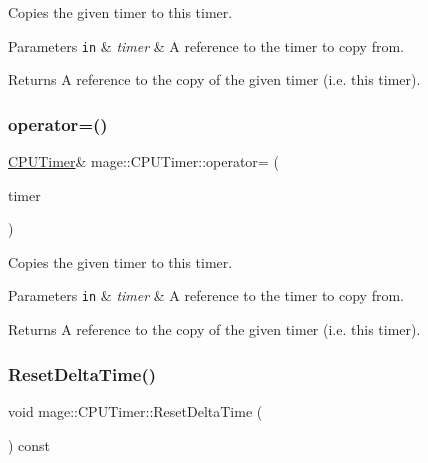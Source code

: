 Copies the given timer to this timer.


\begin{DoxyParams}[1]{Parameters}
\mbox{\tt in}  & {\em timer} & A reference to the timer to copy from. \\
\hline
\end{DoxyParams}
\begin{DoxyReturn}{Returns}
A reference to the copy of the given timer (i.\+e. this timer). 
\end{DoxyReturn}
\hypertarget{classmage_1_1_c_p_u_timer_aee546b06c3b665bc1868abc3d7e3a06d}{}\label{classmage_1_1_c_p_u_timer_aee546b06c3b665bc1868abc3d7e3a06d} 
\subsubsection{\texorpdfstring{operator=()}{operator=()}\hspace{0.1cm}{\footnotesize\ttfamily [2/2]}}
{\footnotesize\ttfamily \hyperlink{classmage_1_1_c_p_u_timer}{C\+P\+U\+Timer}\& mage\+::\+C\+P\+U\+Timer\+::operator= (\begin{DoxyParamCaption}\item[{\hyperlink{classmage_1_1_c_p_u_timer}{C\+P\+U\+Timer} \&\&}]{timer }\end{DoxyParamCaption})\hspace{0.3cm}{\ttfamily [default]}}

Copies the given timer to this timer.


\begin{DoxyParams}[1]{Parameters}
\mbox{\tt in}  & {\em timer} & A reference to the timer to copy from. \\
\hline
\end{DoxyParams}
\begin{DoxyReturn}{Returns}
A reference to the copy of the given timer (i.\+e. this timer). 
\end{DoxyReturn}
\hypertarget{classmage_1_1_c_p_u_timer_a31f7b301c60a2ea63abfc2d39e8bf96b}{}\label{classmage_1_1_c_p_u_timer_a31f7b301c60a2ea63abfc2d39e8bf96b} 
\subsubsection{\texorpdfstring{Reset\+Delta\+Time()}{ResetDeltaTime()}}
{\footnotesize\ttfamily void mage\+::\+C\+P\+U\+Timer\+::\+Reset\+Delta\+Time (\begin{DoxyParamCaption}{ }\end{DoxyParamCaption}) const\hspace{0.3cm}{\ttfamily [private]}}

